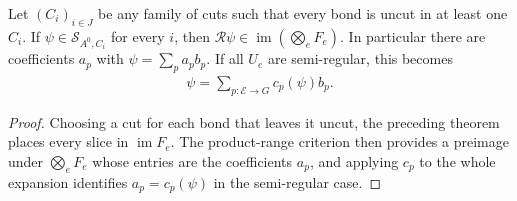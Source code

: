 \begin{lemma}%
    \label{thm:peps_dependent_cut_expansion}
    \leanok
    Let $(C_i)_{i\in J}$ be any family of cuts such that every bond is uncut
    in at least one $C_i$. If $\psi\in\mathcal S_{A^0,C_i}$ for every $i$,
    then $\mathcal R\psi\in\operatorname{im}(\bigotimes_eF_e)$.
    In particular there are coefficients $a_p$ with $\psi=\sum_pa_pb_p$.
    If all $U_e$ are semi-regular, this becomes
    \begin{align}
        \psi=\sum_{p:\mathcal E\to G}c_p(\psi)b_p.
        \label{eq:peps_dependent_extracted_expansion}
    \end{align}
\end{lemma}
\begin{proof}\leanok
    Choosing a cut for each bond that leaves it uncut, the preceding theorem
    places every slice in $\operatorname{im}F_e$. The product-range
    criterion then provides a preimage under $\bigotimes_eF_e$ whose entries
    are the coefficients $a_p$, and applying $c_p$ to the whole expansion
    identifies $a_p=c_p(\psi)$ in the semi-regular case.
\end{proof}

